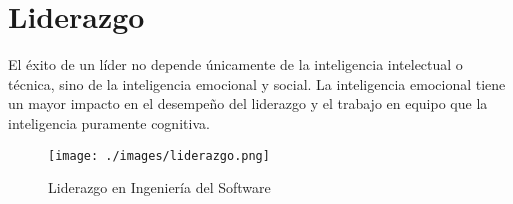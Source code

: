 \documentclass[a4paper,12pt,twoside]{article}
\begin{document}
 

\section{Liderazgo}
    El éxito de un líder no depende únicamente de la inteligencia intelectual o técnica, sino de la 
    inteligencia emocional y social. La inteligencia emocional tiene un mayor impacto en el desempeño 
    del liderazgo y el trabajo en equipo que la inteligencia puramente cognitiva.

    \begin{figure}[H]
        \centering
        \texttt{[image: ./images/liderazgo.png]}
        \caption{Liderazgo en Ingeniería del Software}
        \label{fig:liderazgo}
    \end{figure}
\end{document}

